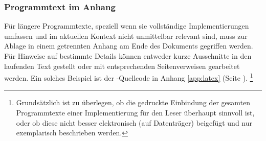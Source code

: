 \subsubsection{Programmtext im Anhang}

Für längere Programmtexte, speziell wenn sie vollständige
Implementierungen umfassen und im aktuellen Kontext nicht
unmittelbar relevant sind, muss zur Ablage in einem getrennten
Anhang am Ende des Dokuments gegriffen werden. Für Hinweise auf bestimmte
Details können entweder kurze Ausschnitte in den laufenden Text
gestellt oder mit entsprechenden Seitenverweisen gearbeitet werden. Ein
solches Beispiel ist der \latex-Quellcode in Anhang
\ref{app:latex} (Seite \pageref{app:latex}).%
\footnote{%
Grundsätzlich ist zu überlegen, ob die gedruckte Einbindung der gesamten
Programmtexte einer Implementierung für den Leser überhaupt sinnvoll ist, oder
ob diese nicht besser elektronisch (auf Datenträger) beigefügt und nur exemplarisch
beschrieben werden.}
